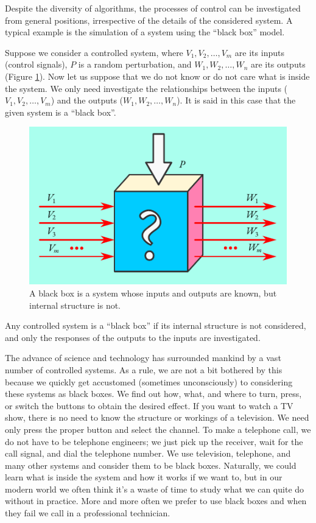 Despite the diversity of algorithms, the processes of control can be
investigated from general positions, irrespective of the details of the
considered system. A typical example is the simulation of a system using
the ``black box'' model.


 Suppose we consider a controlled system,
where $V_{1}, V_{2}, \ldots , V_{m}$ are its inputs (control signals), $P$ is a random perturbation, and $W_{1}, W_{2}, \ldots , W_{n}$ are its outputs (Figure \ref{black-box-1}). Now let us suppose that we do not know or do not care what is inside the system. We only need investigate the relationships between the inputs ( $V_{1}, V_{2}, \ldots , V_{m}$) and the outputs ($W_{1}, W_{2}, \ldots , W_{n}$). It is said in this case that the given system is a ``black box''.

\begin{figure}[!ht]
 \centering
 \includegraphics[width=0.8\linewidth]{figures/black-box-1.pdf}
\caption{A black box is a system whose inputs and outputs are known, but internal structure is not.\label{black-box-1}}
 \end{figure}
 
Any controlled system is a ``black box'' if its internal structure is not
considered, and only the responses of the outputs to the inputs are
investigated.



 The advance of science and
technology has surrounded mankind by a vast number of controlled
systems. As a rule, we are not a bit bothered by this because we quickly
get accustomed (sometimes unconsciously) to considering these systems
as black boxes. We find out how, what, and where to turn, press, or
switch the buttons to obtain the desired effect. If you want to watch
a TV show, there is no need to know the structure or workings of
a television. We need only press the proper button and select the
channel. To make a telephone call, we do not have to be telephone
engineers; we just pick up the receiver, wait for the call signal, and dial
the telephone number. We use television, telephone, and many other
systems and consider them to be black boxes. Naturally, we could learn
what is inside the system and how it works if we want to, but in our
modern world we often think it's a waste of time to study what we can
quite do without in practice. More and more often we prefer to use
black boxes and when they fail we call in a professional technician.

